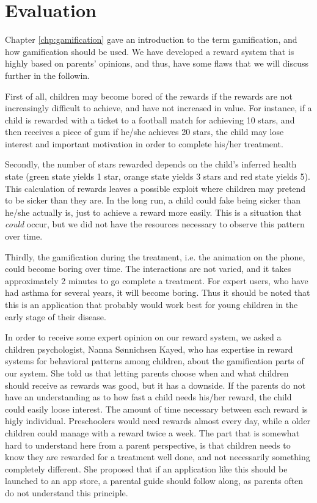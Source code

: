  
\section{Evaluation}
\label{sec:asthmappevaluation}
Chapter \ref{chp:gamification} gave an introduction to the term gamification, and how gamification should be used. We have developed a reward system that is highly based on parents' opinions, and thus, have some flaws that we will discuss further in the followin. 

First of all, children may become bored of the rewards if the rewards are not increasingly difficult to achieve, and have not increased in value. For instance, if a child is rewarded with a ticket to a football match for achieving 10 stars, and then receives a piece of gum if he/she achieves 20 stars, the child may lose interest and important motivation in order to complete his/her treatment. 

Secondly, the number of stars rewarded depends on the child's inferred health state (green state yields 1 star, orange state yields 3 stars and red state yields 5). This calculation of rewards leaves a possible exploit where children may pretend to be sicker than they are. In the long run, a child could fake being sicker than he/she actually is, just to achieve a reward more easily. This is a situation that \emph{could} occur, but we did not have the resources necessary to observe this pattern over time.

Thirdly, the gamification during the treatment, i.e. the animation on the phone, could become boring over time. 
The interactions are not varied, and it takes approximately 2 minutes to go complete a treatment. For expert users, who have had asthma for several years, it will become boring. Thus it should be noted that this is an application that probably would work best for young children in the early stage of their disease.      

In order to receive some expert opinion on our reward system, we asked a children psychologist, Nanna S\o nnichsen Kayed, who has expertise in reward systems for behavioral patterns among children, about the gamification parts of our system. 
She told us that letting parents choose when and what children should receive as rewards was good, but it has a downside. If the parents do not have an understanding as to how fast a child needs his/her reward, the child could easily loose interest. The amount of time necessary between each reward is higly individual. Preschoolers would need rewards almost every day, while a older children could manage with a reward twice a week. The part that is somewhat hard to understand here from a parent perspective, is that children needs to know they are rewarded for a treatment well done, and not necessarily something completely different. She proposed that if an application like this should be launched to an app store, a parental guide should follow along, as parents often do not understand this principle.

